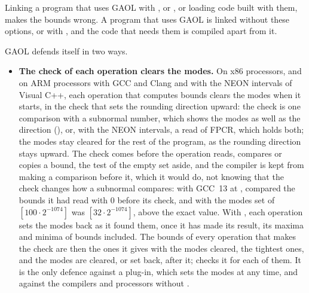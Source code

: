 \documentclass[12pt,a4paper,twoside,openright]{book}
\begin{document}
\begin{Rem}\label{rem:ofast}
Linking a program that uses GAOL with , 
or , or loading code built with them,
makes the bounds wrong. A program that uses GAOL is linked without these
options, or with , and the code that needs them is
compiled apart from it.
\end{Rem}

\noindent
GAOL defends itself in two ways.
\begin{itemize}
\item[$\bullet$] \textbf{The check of each operation clears the modes.} On
  x86 processors, and on ARM processors with GCC and Clang and with the NEON
  intervals of Visual C++, each operation that computes bounds clears the
  modes when it starts, in the check that sets the rounding direction upward:
  the check is one comparison with a subnormal number, which shows the modes
  as well as the direction (), or, with the
  NEON intervals, a read of FPCR, which holds both; the modes stay cleared
  for the rest of the program, as the rounding direction stays upward. The
  check comes before the operation reads, compares or copies a bound, the
  test of the empty set aside, and the compiler is kept from making a
  comparison before it, which it would do, not knowing that the check changes
  how a subnormal compares: with GCC~13 at , 
  compared the bounds it had read with 0 before its check, and with the modes
  set  of $[100\cdot 2^{-1074}]$ was $[32\cdot 2^{-1074}]$,
  above the exact value. With , each
  operation sets the modes back as it found them, once it has made its
  result, its maxima and minima of bounds included. The bounds of every
  operation that makes the check are then the ones it gives with the modes
  cleared, the tightest ones, and the modes are cleared, or set back, after
  it;\newinvfive{}  checks it for each of
  them. It is the only defence against a plug-in, which sets the modes at any
  time, and against the compilers and processors without
  .


\end{itemize}
\end{document}
